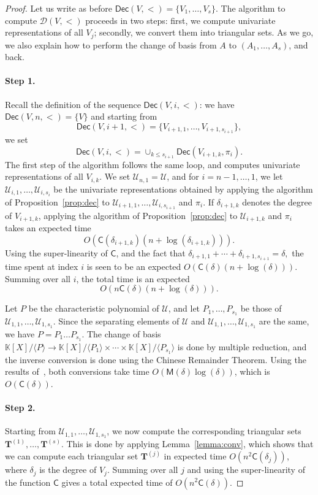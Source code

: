\documentclass[12pt]{article}
\def\CC {\ensuremath{\mathsf{C}}}
\def\K {\ensuremath{\mathbb{K}}}
\def\M {\ensuremath{\mathsf{M}}}
\def\Tt {\ensuremath{\mathbf{T}}}
\def\Ur {\ensuremath{\mathscr U}}
\def\Dr {\ensuremath{\mathscr D}}
\def\Dec {\ensuremath{\mathsf{Dec}}}
\begin{document}
\begin{proof}
  Let us write as before $\Dec(V,<)=\{V_{1},\dots,V_{s}\}$.  The
  algorithm to compute $\Dr(V,<)$ proceeds in two steps: first, we
  compute univariate representations of all $V_j$; secondly, we
  convert them into triangular sets. As we go, we also explain how to
  perform the change of basis from $A$ to $(A_1,\dots,A_s)$, and back.

  \paragraph{Step 1.} Recall the definition of the sequence
  $\Dec(V,i,<)$: we have $\Dec(V,n,<) = \{V\}$ and starting from
    $$\Dec(V,i+1,<)=\{V_{i+1,1},\dots,V_{i+1,s_{i+1}}\},$$
    we set
    $$\Dec(V,i,<) =\cup_{k \le s_{i+1}} \Dec(V_{i+1,k},\pi_i).$$ The
    first step of the algorithm follows the same loop, and computes
    univariate representations of all $V_{i,k}$. We set
    $\Ur_{n,1}=\Ur$, and for $i=n-1,\dots,1$, we let
    $\Ur_{i,1},\dots,\Ur_{i,s_i}$ be the univariate representations
    obtained by applying the algorithm of Proposition~\ref{prop:dec}
    to $\Ur_{i+1,1},\dots,\Ur_{i,s_{i+1}}$ and $\pi_i$. If
    $\delta_{i+1,k}$ denotes the degree of $V_{i+1,k}$, applying the
    algorithm of Proposition~\ref{prop:dec} to $\Ur_{i+1,k}$ and
    $\pi_i$ takes an expected time
    \[
    O(\CC(\delta_{i+1,k})(n+\log(\delta_{i+1,k})) ).
    \]
    Using the super-linearity of $\CC$, and the fact that
    $\delta_{i+1,1}+\cdots+\delta_{i+1,s_{i+1}} = \delta,$ the time
    spent at index $i$ is seen to be an expected
    $O(\CC(\delta)(n+\log(\delta))).$ Summing over all $i$, the total
    time is an expected
    \[
    O(n\CC(\delta)(n+\log(\delta))).
    \]

    Let $P$ be the characteristic polynomial of $\Ur$, and let
    $P_1,\dots,P_{s_1}$ be those of
    $\Ur_{1,1},\dots,\Ur_{1,s_{1}}$. Since the separating elements of
    $\Ur$ and $\Ur_{1,1},\dots,\Ur_{1,s_{1}}$ are the same, we have
    $P=P_1\dots P_{s_1}$. The change of basis $\K[X]/\langle P\rangle
    \to \K[X]/\langle P_1\rangle\times \cdots\times \K[X]/\langle
    P_{s_1}\rangle$ is done by multiple reduction, and the inverse
    conversion is done using the Chinese Remainder Theorem. Using the
    results of~\cite[Chapter~10]{GaGe03}, both conversions take time
    $O(\M(\delta)\log(\delta))$, which is $O(\CC(\delta))$.

    \paragraph{Step 2.} Starting from $\Ur_{1,1},\dots,\Ur_{1,s_{1}}$,
    we now compute the corresponding triangular sets
    $\Tt^{(1)},\dots,\Tt^{(s)}$. This is done by applying
    Lemma~\ref{lemma:conv}, which shows that we can compute each
    triangular set $\Tt^{(j)}$ in expected time $O(n^2\CC(\delta_j))$,
    where $\delta_j$ is the degree of $V_j$. Summing over all $j$ and
    using the super-linearity of the function $\CC$ gives a total
    expected time of $O(n^2\CC(\delta))$.


\end{proof}
\end{document}
